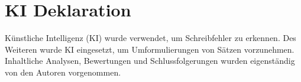 


\chapter{KI Deklaration} %

\label{ApendixC} %

Künstliche Intelligenz (KI) wurde verwendet, um Schreibfehler zu erkennen. Des Weiteren wurde KI eingesetzt, um Umformulierungen von Sätzen vorzunehmen. Inhaltliche Analysen, Bewertungen und Schlussfolgerungen wurden eigenständig von den Autoren vorgenommen.